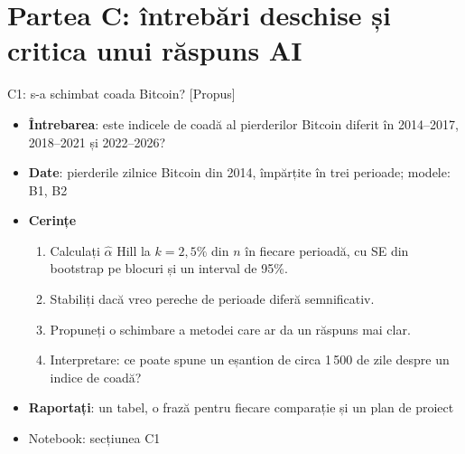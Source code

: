 \section{Partea C: întrebări deschise și critica unui răspuns AI}

\begin{frame}{C1: s-a schimbat coada Bitcoin? [Propus]}
\itemsize{\footnotesize}
\begin{itemize}
\item \textbf{Întrebarea}: este indicele de coadă al pierderilor Bitcoin diferit în 2014--2017, 2018--2021 și 2022--2026?
\item \textbf{Date}: pierderile zilnice Bitcoin din 2014, împărțite în trei perioade; modele: B1, B2
\item \textbf{Cerințe}
\begin{enumerate}
    \item Calculați $\hat\alpha$ Hill la $k = 2{,}5\%$ din $n$ în fiecare perioadă, cu SE din bootstrap pe blocuri și un interval de 95\%.
    \item Stabiliți dacă vreo pereche de perioade diferă semnificativ.
    \item Propuneți o schimbare a metodei care ar da un răspuns mai clar.
    \item Interpretare: ce poate spune un eșantion de circa 1\,500 de zile despre un indice de coadă?
\end{enumerate}
\item \textbf{Raportați}: un tabel, o frază pentru fiecare comparație și un plan de proiect
\item Notebook: secțiunea C1
\end{itemize}
\end{frame}

